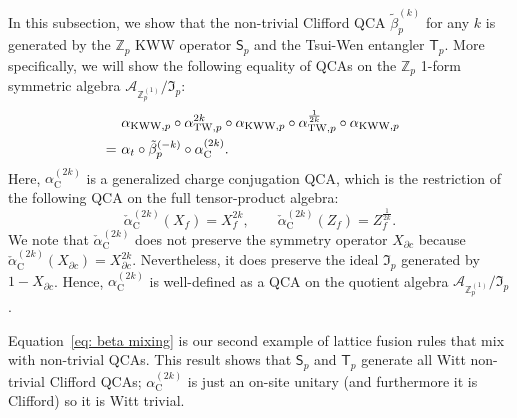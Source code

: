 \documentclass[aps,twocolumn,prx,floatfix,preprintnumbers, nofootinbib,10pt]{revtex4-2}
\numberwithin{equation}{section}
\theoremstyle{definition}
\theoremstyle{remark}
\theoremstyle{claim}
\newcommand{\ba}{\begin{aligned}}
\newcommand{\ea}{\end{aligned}}
\newcommand{\aKWWp}{\alpha_{\text{KWW},p}}
\newcommand{\aTWp}{\alpha_{\text{TW},p}}
\renewcommand{\sf}[1]{\mathsf{#1}}
\begin{document}
In this subsection, we show that the non-trivial Clifford QCA $\tilde{\beta}_p^{(k)}$ for any $k$ is generated by the $\mathbb{Z}_p$ KWW operator $\mathsf{S}_p$ and the Tsui-Wen entangler $\sf{T}_p$.
More specifically, we will show the following equality of QCAs on the $\mathbb{Z}_p$ 1-form symmetric algebra $\mathcal{A}_{\mathbb{Z}_p^{(1)}} / \mathfrak{I}_p$:
\begin{equation}
\ba
&~\aKWWp \circ \aTWp^{2k} \circ \aKWWp \circ \aTWp^{\frac{1}{2k}} \circ \aKWWp \cr 
=&~ \alpha_t \circ \tilde{\beta}_p^{(-k)} \circ \alpha_{\text{C}}^{(2k)}.
\label{eq: beta mixing}
\ea \end{equation}
Here, $\alpha_{\text{C}}^{(2k)}$ is a generalized charge conjugation QCA, which is the restriction of the following QCA on the full tensor-product algebra:
\begin{equation}
\check{\alpha}_{\text{C}}^{(2k)}(X_f) = X_f^{2k}, \qquad
\check{\alpha}_{\text{C}}^{(2k)}(Z_f) = Z_f^{\frac{1}{2k}}.
\end{equation}
We note that $\check{\alpha}_{\text{C}}^{(2k)}$ does not preserve the symmetry operator $X_{\partial c}$ because $\check{\alpha}_{\text{C}}^{(2k)}(X_{\partial c}) = X_{\partial c}^{2k}$.
Nevertheless, it does preserve the ideal $\mathfrak{I}_p$ generated by $1-X_{\partial c}$.
Hence, $\alpha_{\text{C}}^{(2k)}$ is well-defined as a QCA on the quotient algebra $\mathcal{A}_{\mathbb{Z}_p^{(1)}}/\mathfrak{I}_p$.

Equation~\eqref{eq: beta mixing} is our second example of lattice fusion rules that mix with non-trivial QCAs.
This result shows that $\mathsf{S}_p$ and $\mathsf{T}_p$ generate all Witt non-trivial Clifford QCAs; $\alpha_\text{C}^{(2k)}$ is just an on-site unitary (and furthermore it is Clifford) so it is Witt trivial.
\end{document}
